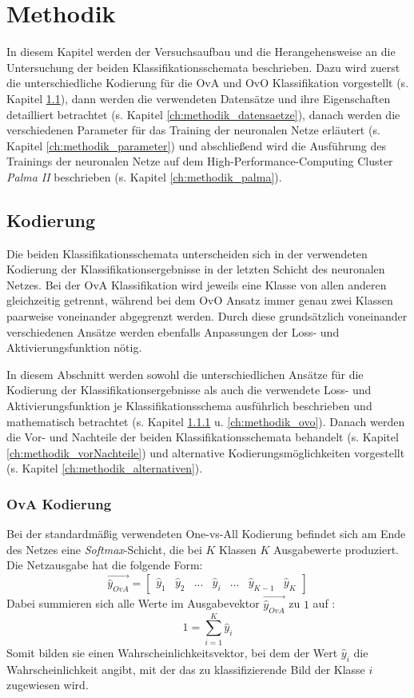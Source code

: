 \chapter{Methodik}
\label{ch:methodik}
In diesem Kapitel werden der Versuchsaufbau und die Herangehensweise an die Untersuchung der beiden Klassifikationsschemata beschrieben. Dazu wird zuerst die unterschiedliche Kodierung für die OvA und OvO Klassifikation vorgestellt (s. Kapitel \ref{ch:methodik_kodierung}), dann werden die verwendeten Datensätze und ihre Eigenschaften detailliert betrachtet (s. Kapitel \ref{ch:methodik_datensaetze}), danach werden die verschiedenen Parameter für das Training der neuronalen Netze erläutert (s. Kapitel \ref{ch:methodik_parameter}) und abschließend wird die Ausführung des Trainings der neuronalen Netze auf dem High-Performance-Computing Cluster \textit{Palma II} \cite{palma2} beschrieben (s. Kapitel \ref{ch:methodik_palma}).
\section{Kodierung}
\label{ch:methodik_kodierung}
Die beiden Klassifikationsschemata unterscheiden sich in der verwendeten Kodierung der Klassifikationsergebnisse in der letzten Schicht des neuronalen Netzes. Bei der OvA Klassifikation wird jeweils eine Klasse von allen anderen gleichzeitig getrennt, während bei dem OvO Ansatz immer genau zwei Klassen paarweise voneinander abgegrenzt werden.
Durch diese grundsätzlich voneinander verschiedenen Ansätze werden ebenfalls Anpassungen der Loss- und Aktivierungsfunktion nötig.

In diesem Abschnitt werden sowohl die unterschiedlichen Ansätze für die Kodierung der Klassifikationsergebnisse als auch die verwendete Loss- und Aktivierungsfunktion je Klassifikationsschema ausführlich beschrieben und mathematisch betrachtet (s. Kapitel \ref{ch:methodik_ova} u. \ref{ch:methodik_ovo}).
Danach werden die Vor- und Nachteile der beiden Klassifikationsschemata behandelt (s. Kapitel \ref{ch:methodik_vorNachteile}) und alternative Kodierungsmöglichkeiten vorgestellt (s. Kapitel \ref{ch:methodik_alternativen}).
\newpage
\subsection{OvA Kodierung}
\label{ch:methodik_ova}
Bei der standardmäßig verwendeten One-vs-All Kodierung befindet sich am Ende des Netzes eine \textit{Softmax}-Schicht, die bei $K$ Klassen $K$ Ausgabewerte produziert.
Die Netzausgabe hat die folgende Form:
\[\overrightarrow{\widehat{y}_{OvA}} = \begin{bmatrix}
\widehat{y}_1 & \widehat{y}_2 & ... & \widehat{y}_i & ... & \widehat{y}_{K-1} & \widehat{y}_K
\end{bmatrix} \]
Dabei summieren sich alle Werte im Ausgabevektor $\overrightarrow{\widehat{y}_{OvA}}$ zu $1$ auf :
\[1 = \sum_{i=1}^K{\widehat{y}_i}\]
Somit bilden sie einen Wahrscheinlichkeitsvektor, bei dem der Wert $\widehat{y}_i$ die Wahrscheinlichkeit angibt, mit der das zu klassifizierende Bild der Klasse $i$ zugewiesen wird.\\

